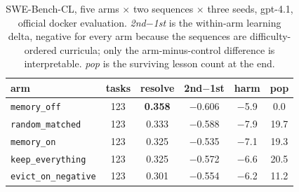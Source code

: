 \begin{table}[t]
\centering
\tabsize
\caption{SWE-Bench-CL, five arms $\times$ two sequences $\times$ three
seeds, gpt-4.1, official docker evaluation. \emph{2nd$-$1st} is the
within-arm learning delta, negative for every arm because the sequences
are difficulty-ordered curricula; only the arm-minus-control difference
is interpretable. \emph{pop} is the surviving lesson count at the end.}
\label{tab:swebench}
\begin{tabular}{lccccc}
\toprule
arm & tasks & resolve & 2nd$-$1st & harm & pop \\
\midrule
\texttt{memory\_off}       & 123 & \textbf{0.358} & $-$0.606 & $-$5.9 & 0.0 \\
\texttt{random\_matched}   & 123 & 0.333 & $-$0.588 & $-$7.9 & 19.7 \\
\texttt{memory\_on}        & 123 & 0.325 & $-$0.535 & $-$7.1 & 19.3 \\
\texttt{keep\_everything}  & 123 & 0.325 & $-$0.572 & $-$6.6 & 20.5 \\
\texttt{evict\_on\_negative} & 123 & 0.301 & $-$0.554 & $-$6.2 & 11.2 \\
\bottomrule
\end{tabular}
\end{table}
